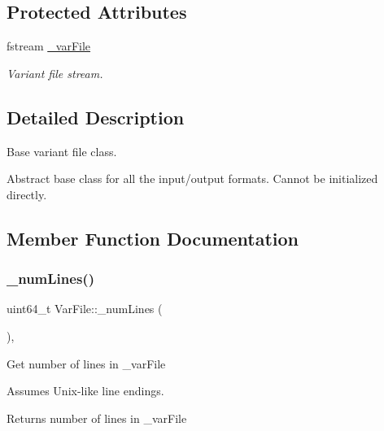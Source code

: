 \subsection*{Protected Attributes}
\begin{DoxyCompactItemize}
\item 
\mbox{\label{classvarfiles_1_1_var_file_a72fee6eb0df1da4957b653384a23513a}} 
fstream \hyperlink{classvarfiles_1_1_var_file_a72fee6eb0df1da4957b653384a23513a}{\+\_\+var\+File}
\begin{DoxyCompactList}\small\item\em Variant file stream. \end{DoxyCompactList}\end{DoxyCompactItemize}


\subsection{Detailed Description}
Base variant file class. 

Abstract base class for all the input/output formats. Cannot be initialized directly. 

\subsection{Member Function Documentation}
\mbox{\label{classvarfiles_1_1_var_file_a029a1a5577fb735c338750d2dec62ab6}} 
\subsubsection{\texorpdfstring{\+\_\+num\+Lines()}{\_numLines()}}
{\footnotesize\ttfamily uint64\+\_\+t Var\+File\+::\+\_\+num\+Lines (\begin{DoxyParamCaption}{ }\end{DoxyParamCaption})\hspace{0.3cm}{\ttfamily [protected]}, {\ttfamily [virtual]}}



Get number of lines in {\ttfamily \+\_\+var\+File} 

Assumes Unix-\/like line endings.

\begin{DoxyReturn}{Returns}
number of lines in {\ttfamily \+\_\+var\+File} 
\end{DoxyReturn}


